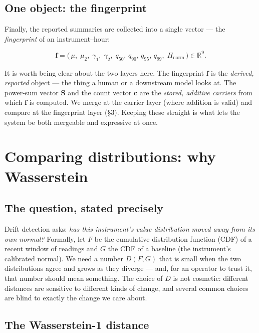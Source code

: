 \documentclass[11pt]{article}
\theoremstyle{definition}
\newcommand{\R}{\mathbb{R}}
\newcommand{\powsum}{\mathbf{S}}
\newcommand{\fvec}{\mathbf{f}}
\begin{document}
\subsection{One object: the fingerprint}

Finally, the reported summaries are collected into a single vector --- the \emph{fingerprint} of an
instrument--hour:

\begin{equation}
  \fvec = \bigl(\,\mu,\; \mu_2,\; \gamma_1,\; \gamma_2,\;
  q_{50},\, q_{90},\, q_{95},\, q_{99},\; H_{\text{norm}}\,\bigr) \in \R^9 .
\end{equation}

It is worth being clear about the two layers here. The fingerprint $\fvec$ is the \emph{derived,
reported} object --- the thing a human or a downstream model looks at. The power-sum vector
$\powsum$ and the count vector $\mathbf{c}$ are the \emph{stored, additive carriers} from which
$\fvec$ is computed. We merge at the carrier layer (where addition is valid) and compare at the
fingerprint layer (\S3). Keeping these straight is what lets the system be both mergeable and
expressive at once.


\section{Comparing distributions: why Wasserstein}

\subsection{The question, stated precisely}

Drift detection asks: \emph{has this instrument's value distribution moved away from its own
normal?} Formally, let $F$ be the cumulative distribution function (CDF) of a recent window of
readings and $G$ the CDF of a baseline (the instrument's calibrated normal). We need a number
$D(F, G)$ that is small when the two distributions agree and grows as they diverge --- and, for an
operator to trust it, that number should mean something. The choice of $D$ is not cosmetic: different
distances are sensitive to different kinds of change, and several common choices are blind to
exactly the change we care about.

\subsection{The Wasserstein-1 distance}
\end{document}

